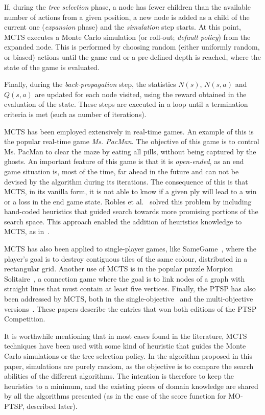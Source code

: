 \documentclass[journal]{IEEEtran}
\begin{document}
If, during the \textit{tree selection} phase, a node has fewer children than the available number of actions from a given position, a new node is added as a child of the current one (\textit{expansion} phase) and the \textit{simulation} step starts. At this point, MCTS executes a Monte Carlo simulation (or roll-out; \textit{default policy}) from the expanded node. This is performed by choosing random (either uniformly random, or biased) actions until the game end or a pre-defined depth is reached, where the state of the game is evaluated. 

Finally, during the \textit{back-propagation} step, the statistics $N(s)$, $N(s,a)$ and $Q(s,a)$ are updated for each node visited, using the reward obtained in the evaluation of the state. These steps are executed in a loop until a termination criteria is met (such as number of iterations).


MCTS has been employed extensively in real-time games. An example of this is the popular real-time game \textit{Ms. PacMan}. The objective of this game is to control Ms. PacMan to clear the maze by eating all pills, without being captured by the ghosts. An important feature of this game is that it is \textit{open-ended}, as an end game situation is, most of the time, far ahead in the future and can not be devised by the algorithm during its iterations. The consequence of this is that MCTS, in its vanilla form, it is not able to know if a given ply will lead to a win or a loss in the end game state. Robles et al.~\cite{Robles2009} solved this problem by including hand-coded heuristics that guided search towards more promising portions of the search space. This approach enabled the addition of heuristics knowledge to MCTS, as in~\cite{Samothrakis, Ikehata2010}.

MCTS has also been applied to single-player games, like SameGame~\cite{Schadd2008}, where the player's goal is to destroy contiguous tiles of the same colour, distributed in a rectangular grid. Another use of MCTS is in the popular puzzle Morpion Solitaire~\cite{Cazenave2007}, a connection game where the goal is to link nodes of a graph with straight lines that must contain at least five vertices. Finally, the PTSP has also been addressed by MCTS, both in the single-objective~\cite{Perez2013, Powley2012} and the multi-objective versions~\cite{Powley2013}. These papers describe the entries that won both editions of the PTSP Competition.

It is worthwhile mentioning that in most cases found in the literature, MCTS techniques have been used with some kind of heuristic that guides the Monte Carlo simulations or the tree selection policy. In the algorithm proposed in this paper, simulations are purely random, as the objective is to compare the search abilities of the different algorithms. The intention is therefore to keep the heuristics to a minimum, and the existing pieces of domain knowledge are shared by all the algorithms presented (as in the case of the score function for MO-PTSP, described later).
\end{document}
